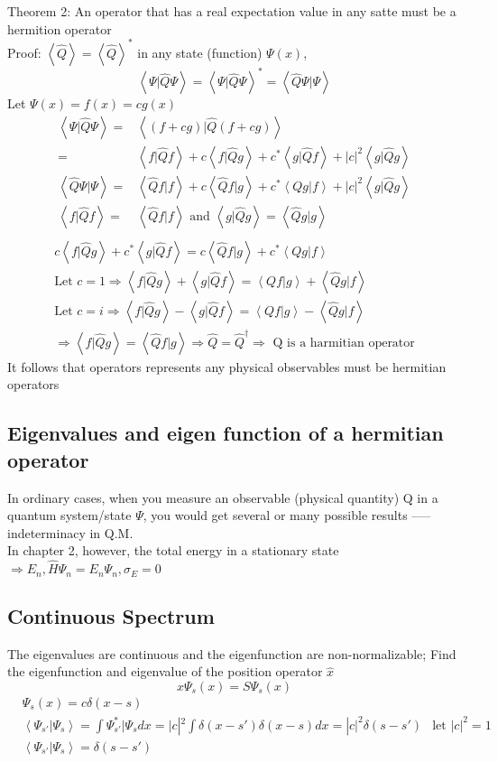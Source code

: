 \documentclass[12pt, a4paper]{article}
\begin{document}
Theorem 2: An operator that has a real expectation value in any satte must be a hermition operator\\
Proof: $\left<\hat{Q}\right>=\left<\hat{Q}\right>^*$ in any state (function) $\Psi(x)$, $$\left<\Psi|\hat{Q}\Psi\right>=\left<\Psi|\hat{Q}\Psi\right>^*=\left<\hat{Q}\Psi|\Psi\right>$$ Let $\Psi(x)=f(x)=cg(x)$
\begin{align*}
\left<\Psi|\hat{Q}\Psi\right>=&\left<(f+cg)|\hat{Q}(f+cg)\right>\\
=&\left<f|\hat{Q}f\right>+c\left<f|\hat{Q}g\right>+c^*\left<g|\hat{Q}f\right>+|c|^2\left<g|\hat{Q}g\right>\\
\left<\hat{Q}\Psi|\Psi\right>=&\left<\hat{Q}f|f\right>+c\left<\hat{Q}f|g\right>+c^*\left<Qg|f\right>+|c|^2\left<g|\hat{Q}g\right>\\
\left<f|\hat{Q}f\right>=&\left<\hat{Q}f|f\right> \text{ and } \left<g|\hat{Q}g\right>=\left<\hat{Q}g|g\right>\\
\end{align*}
\begin{align*}
c\left<f|\hat{Q}g\right>+c^*\left<g|\hat{Q}f\right>=c\left<\hat{Q}f|g\right>+c^*\left<Qg|f\right>\\
\text{Let } c=1\Rightarrow \left<f|\hat{Q}g\right>+\left<g|\hat{Q}f\right>=\left<Qf|g\right>+\left<\hat{Q}g|f\right>\\
\text{Let } c=i\Rightarrow \left<f|\hat{Q}g\right>-\left<g|\hat{Q}f\right>=\left<Qf|g\right>-\left<\hat{Q}g|f\right>\\
\Rightarrow \left<f|\hat{Q}g\right>=\left<\hat{Q}f|g\right>\Rightarrow \hat{Q}=\hat{Q}^{\dagger}\Rightarrow \text{ Q is a harmitian operator}
\end{align*}
It follows that operators represents any physical observables must be hermitian operators
\subsection{Eigenvalues and eigen function of a hermitian operator}
In ordinary cases, when you measure an observable (physical quantity) Q in a quantum system/state $\Psi$, you would get several or many possible results ----- indeterminacy in Q.M.\\
In chapter 2, however, the total energy in a stationary state $\Rightarrow E_n,\hat{H}\Psi_n=E_n\Psi_n,\sigma_E=0$ 
\subsection{Continuous Spectrum}
The eigenvalues are continuous and the eigenfunction are non-normalizable;
Find the eigenfunction and eigenvalue of the position operator $\hat{x}$
$$x\Psi_s(x)=S\Psi_s(x)$$
\begin{align*}
&\Psi_s(x)=c\delta(x-s)\\
&\left<\Psi_{s'}|\Psi_s\right>=\int\Psi_{s'}^*|\Psi_sdx=|c|^2\int\delta(x-s')\delta(x-s)dx=|c|^2\delta(s-s')
&\text{let }|c|^2=1\\
&\left<\Psi_{s'}|\Psi_s\right>=\delta(s-s')
\end{align*}
\end{document}
